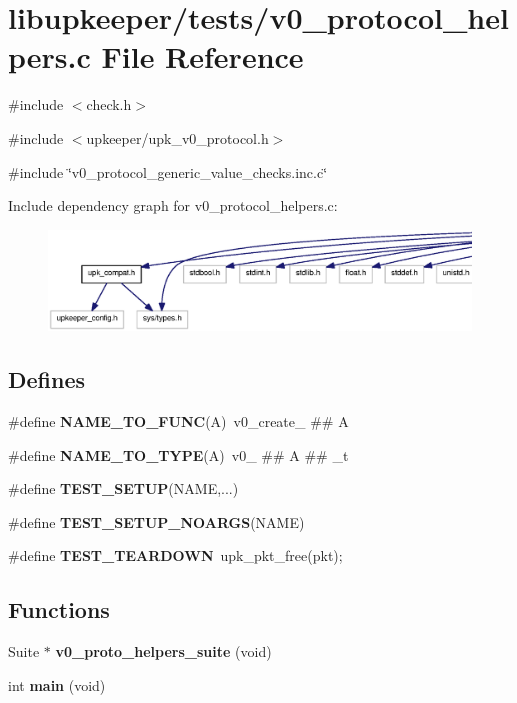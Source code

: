 \section{libupkeeper/tests/v0\_\-protocol\_\-helpers.c File Reference}
\label{v0__protocol__helpers_8c}
{\ttfamily \#include $<$check.h$>$}\par
{\ttfamily \#include $<$upkeeper/upk\_\-v0\_\-protocol.h$>$}\par
{\ttfamily \#include \char`\"{}v0\_\-protocol\_\-generic\_\-value\_\-checks.inc.c\char`\"{}}\par
Include dependency graph for v0\_\-protocol\_\-helpers.c:
\nopagebreak
\begin{figure}[H]
\begin{center}
\leavevmode
\includegraphics[width=400pt]{v0__protocol__helpers_8c__incl}
\end{center}
\end{figure}
\subsection*{Defines}
\begin{DoxyCompactItemize}
\item 
\#define {\bf NAME\_\-TO\_\-FUNC}(A)~v0\_\-create\_\- \#\# A
\item 
\#define {\bf NAME\_\-TO\_\-TYPE}(A)~v0\_\- \#\# A \#\# \_\-t
\item 
\#define {\bf TEST\_\-SETUP}(NAME,...)
\item 
\#define {\bf TEST\_\-SETUP\_\-NOARGS}(NAME)
\item 
\#define {\bf TEST\_\-TEARDOWN}~upk\_\-pkt\_\-free(pkt);
\end{DoxyCompactItemize}
\subsection*{Functions}
\begin{DoxyCompactItemize}
\item 
Suite $\ast$ {\bf v0\_\-proto\_\-helpers\_\-suite} (void)
\item 
int {\bf main} (void)
\end{DoxyCompactItemize}


